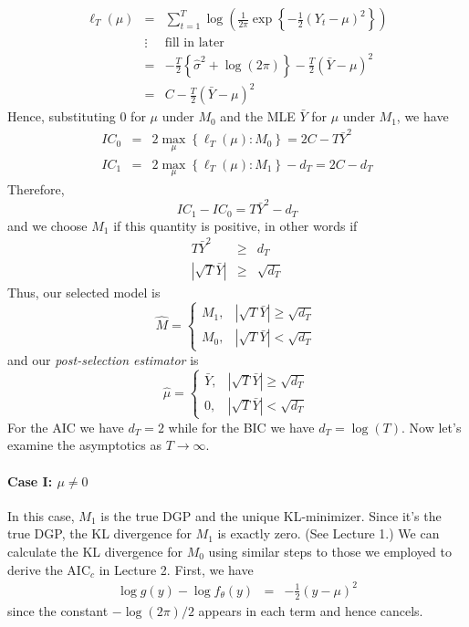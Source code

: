 \documentclass[12pt]{article}
\theoremstyle{definition}
\begin{document}
\begin{eqnarray*}
	\ell_T(\mu)&=& \sum_{t=1}^T \log \left( \frac{1}{2\pi} \exp \left\{-\frac{1}{2}(Y_t - \mu)^2 \right\}\right)\\
	&\vdots& \boxed{\mbox{fill in later}}\\
	&=& -\frac{T}{2} \left\{ \widehat{\sigma}^2 + \log(2\pi)\right\} - \frac{T}{2}\left(\bar{Y} - \mu \right)^2\\
	&=& C - \frac{T}{2}\left(\bar{Y} - \mu \right)^2
\end{eqnarray*}
Hence, substituting $0$ for $\mu$ under $M_0$ and the MLE $\bar{Y}$ for $\mu$ under $M_1$, we have
	\begin{eqnarray*}
		IC_0 &=& 2 \max_\mu \left\{\ell_T(\mu)\colon M_0 \right\} = 2C - T\bar{Y}^2\\
		IC_1 &=&2 \max_\mu \left\{\ell_T(\mu)\colon M_1 \right\} - d_T = 2C - d_T
	\end{eqnarray*}
Therefore,
	$$IC_1 - IC_0 = T\bar{Y}^2 - d_T$$
and we choose $M_1$ if this quantity is positive, in other words if
	\begin{eqnarray*}
		T\bar{Y}^2 &\geq& d_T\\
		\left|\sqrt{T} \bar{Y} \right| &\geq& \sqrt{d_T}
	\end{eqnarray*}
Thus, our selected model is 
	$$\widehat{M} = \left\{\begin{array}
		{cc} M_1, & |\sqrt{T}\bar{Y} | \geq \sqrt{d_T} \\
		M_0, & |\sqrt{T}\bar{Y} |  < \sqrt{d_T}
	\end{array} \right.$$
and our \emph{post-selection estimator} is 
	$$\widehat{\mu}=\left\{\begin{array}
		{cc} \bar{Y}, & |\sqrt{T}\bar{Y} | \geq \sqrt{d_T} \\
		0, & |\sqrt{T}\bar{Y} | < \sqrt{d_T}
		\end{array}\right.$$
For the AIC we have $d_T = 2$ while for the BIC we have $d_T = \log(T)$. Now let's examine the asymptotics as $T \rightarrow \infty$.

\paragraph{Case I: $\mu \neq 0$} In this case, $M_1$ is the true DGP and the unique KL-minimizer. Since it's the true DGP, the KL divergence for $M_1$ is exactly zero. (See Lecture 1.) We can calculate the KL divergence for $M_0$ using similar steps to those we employed to derive the AIC$_c$ in Lecture 2. First, we have
	\begin{eqnarray*}
		\log g(y) - \log f_\theta(y) &=& -\frac{1}{2}(y-\mu)^2
	\end{eqnarray*}
since the constant $-\log(2\pi)/2$ appears in each term and hence cancels.
\end{document}

